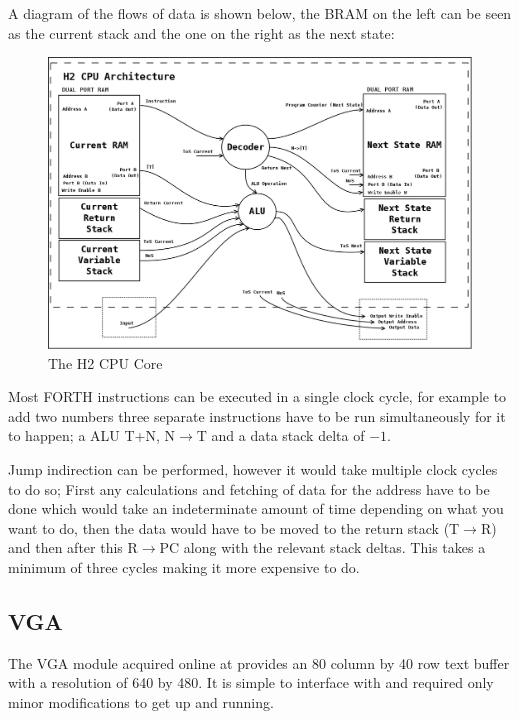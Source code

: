 \documentclass	[a4paper, 10pt]	{article}
\begin{document}
      A diagram of the flows of data is shown below, the BRAM on the left can be seen as the current stack
      and the one on the right as the next state:

      \begin{figure}[ht]
        \centering
        \includegraphics[width=1.1\textwidth]{pic/h2.png}
        \caption{The H2 CPU Core}
        \label{fig:H2 CPU Core}
      \end{figure}
      \FloatBarrier

      Most FORTH instructions can be executed in a single clock cycle, for example to add two numbers
      three separate instructions have to be run simultaneously for it to happen; a ALU T+N, N$\to$T and
      a data stack delta of $-1$.

      Jump indirection can be performed, however it would take multiple clock cycles to do so; First any
      calculations and fetching of data for the address have to be done which would take an indeterminate
      amount of time depending on what you want to do, then the data would have to be moved to the return
      stack (T$\to$R) and then after this R$\to$PC along with the relevant stack deltas. This takes a
      minimum of three cycles making it more expensive to do.

    \subsection{VGA}

    The VGA module acquired online at \cite{vgacore} provides an 80 column by 40 row text buffer with
    a resolution of 640 by 480. It is simple to interface with and required only minor modifications
    to get up and running.
\end{document}
